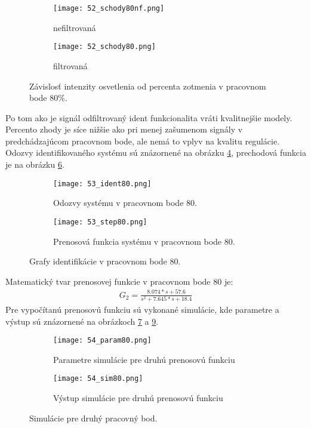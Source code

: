 \begin{figure}[!htbp]
\centering
\begin{subfigure}{0.5\linewidth}
\texttt{[image: 52\_schody80nf.png]}
\caption{nefiltrovaná}
\label{52_schodynf80}
\end{subfigure}%
\begin{subfigure}{0.5\linewidth}
\texttt{[image: 52\_schody80.png]}
\caption{filtrovaná}
\label{52_schody80}
\end{subfigure}
\caption{Závislosť intenzity osvetlenia od percenta zotmenia v pracovnom bode 80\%. }
\end{figure} 
 
Po tom ako je signál odfiltrovaný ident funkcionalita vráti kvalitnejšie modely. Percento zhody je síce nižšie ako pri menej zašumenom signály v predchádzajúcom pracovnom bode, ale nemá to vplyv na kvalitu regulácie. Odozvy identifikovaného systému sú znázornené na obrázku \ref{53_ident80}, prechodová funkcia je na obrázku \ref{53_step80}.
\begin{figure}[!htbp]
\centering
\begin{subfigure}{0.5\linewidth}
\texttt{[image: 53\_ident80.png]}
\caption{Odozvy systému v pracovnom bode 80.}
\label{53_ident80}
\end{subfigure}%
\begin{subfigure}{0.5\linewidth}
\texttt{[image: 53\_step80.png]}
\caption{Prenosová funkcia systému v pracovnom bode 80.}
\label{53_step80}
\end{subfigure}
\caption{Grafy identifikácie v pracovnom bode 80.}
\end{figure}  
Matematický tvar prenosovej funkcie v pracovnom bode 80 je:
\begin{equation} \label{eq41}
\begin{split}
 G_2 = \frac{8.074*s + 57.6}{s^2 + 7.645*s + 18.4}
\end{split}
\end{equation}
Pre vypočítanú prenosovú funkciu sú vykonané simulácie, kde parametre a výstup sú znázornené na obrázkoch \ref{54_param80} a \ref{54_sim80}.
\begin{figure}[!htbp]
\centering
\begin{subfigure}{0.5\linewidth}
\texttt{[image: 54\_param80.png]}
\caption{Parametre simulácie pre druhú prenosovú funkciu}
\label{54_param80}
\end{subfigure}%
\begin{subfigure}{0.5\linewidth}
\texttt{[image: 54\_sim80.png]}
\caption{Výstup simulácie pre druhú prenosovú funkciu}
\label{54_sim80}
\end{subfigure}
\caption{Simulácie pre druhý pracovný bod.}
\end{figure}
